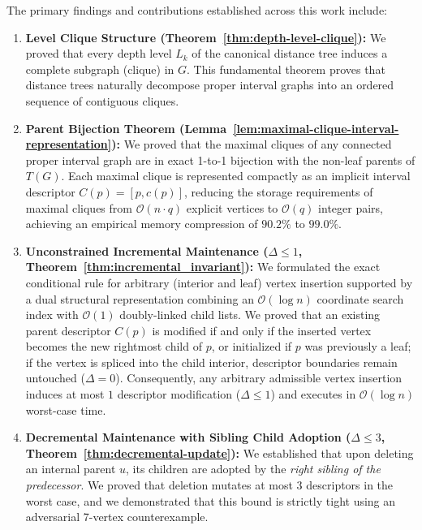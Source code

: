 The primary findings and contributions established across this work include:
\begin{enumerate}[label=\textbf{\arabic*.}]
    \item \textbf{Level Clique Structure (Theorem~\ref{thm:depth-level-clique}):} We proved that every depth level $L_k$ of the canonical distance tree induces a complete subgraph (clique) in $G$. This fundamental theorem proves that distance trees naturally decompose proper interval graphs into an ordered sequence of contiguous cliques.
    
    \item \textbf{Parent Bijection Theorem (Lemma~\ref{lem:maximal-clique-interval-representation}):} We proved that the maximal cliques of any connected proper interval graph are in exact 1-to-1 bijection with the non-leaf parents of $T(G)$. Each maximal clique is represented compactly as an implicit interval descriptor $C(p) = [p, c(p)]$, reducing the storage requirements of maximal cliques from $\mathcal{O}(n \cdot q)$ explicit vertices to $\mathcal{O}(q)$ integer pairs, achieving an empirical memory compression of $90.2\%$ to $99.0\%$.
    
    \item \textbf{Unconstrained Incremental Maintenance ($\Delta \le 1$, Theorem~\ref{thm:incremental_invariant}):} We formulated the exact conditional rule for arbitrary (interior and leaf) vertex insertion supported by a dual structural representation combining an $\mathcal{O}(\log n)$ coordinate search index with $\mathcal{O}(1)$ doubly-linked child lists. We proved that an existing parent descriptor $C(p)$ is modified if and only if the inserted vertex becomes the new rightmost child of $p$, or initialized if $p$ was previously a leaf; if the vertex is spliced into the child interior, descriptor boundaries remain untouched ($\Delta = 0$). Consequently, any arbitrary admissible vertex insertion induces at most $1$ descriptor modification ($\Delta \le 1$) and executes in $\mathcal{O}(\log n)$ worst-case time.
    
    \item \textbf{Decremental Maintenance with Sibling Child Adoption ($\Delta \le 3$, Theorem~\ref{thm:decremental-update}):} We established that upon deleting an internal parent $u$, its children are adopted by the \emph{right sibling of the predecessor}. We proved that deletion mutates at most $3$ descriptors in the worst case, and we demonstrated that this bound is strictly tight using an adversarial 7-vertex counterexample.
    

\end{enumerate}
